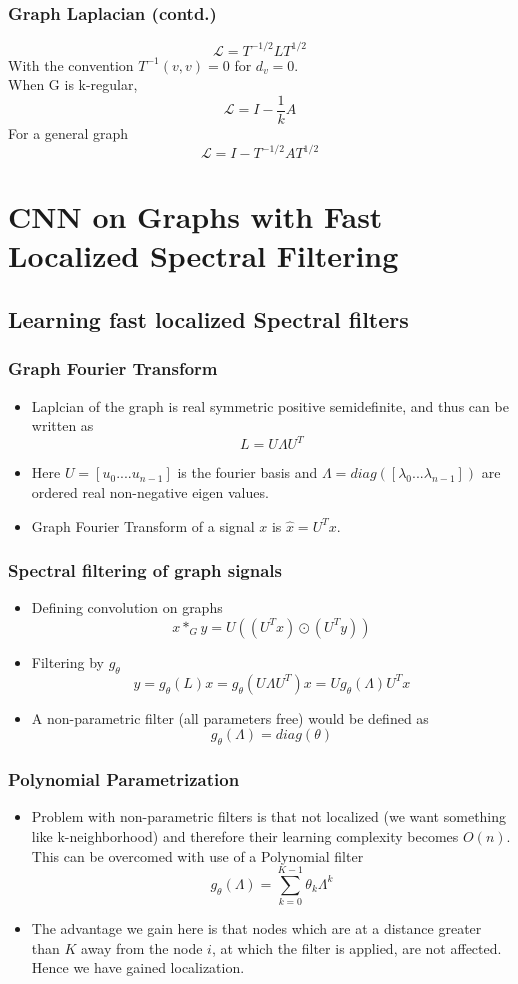 \documentclass{beamer}
\begin{document}
\begin{frame}
  \frametitle{Graph Laplacian (contd.)}
  $$\mathcal{L} = T^{-1/2}LT^{1/2}$$
  With the convention $T^{-1}(v,v) = 0$ for $d_v = 0$.\\
  When G is k-regular,
  $$\mathcal{L} = I - \frac{1}{k}A$$
  For a general graph
  $$\mathcal{L} = I - T^{-1/2}AT^{1/2}$$
\end{frame}

\section{CNN on Graphs with Fast Localized Spectral Filtering}
\subsection{Learning fast localized Spectral filters}
\begin{frame}
  \frametitle{Graph Fourier Transform}
  \begin{itemize}
  \item Laplcian of the graph is real symmetric positive semidefinite, and thus can be written as
    $$L = U \Lambda U^{T}$$
  \item Here $U = [u_0 .... u_{n-1}]$ is the fourier basis and $\Lambda = diag([\lambda_0...\lambda_{n-1}])$ are ordered real non-negative eigen values.
  \item Graph Fourier Transform of a signal $x$ is $\hat{x} = U^{T}x$.
  \end{itemize}
\end{frame}

\begin{frame}
  \frametitle{Spectral filtering of graph signals}
  \begin{itemize}
  \item Defining convolution on graphs
    $$ x *_{G} y = U((U^T x) \odot (U^T y))$$
  \item Filtering by $g_{\theta}$
    $$ y = g_{\theta}(L)x = g_{\theta}(U \Lambda U^{T})x = Ug_{\theta}(\Lambda) U^T x $$
  \item A non-parametric filter (all parameters free) would be defined as
    $$g_{\theta}(\Lambda) = diag(\theta)$$
  \end{itemize}
\end{frame}

\begin{frame}
  \frametitle{Polynomial Parametrization}
  \begin{itemize}
  \item   Problem with non-parametric filters is that not localized (we want something like k-neighborhood) and therefore their learning complexity becomes $O(n)$. This can be overcomed with use of a Polynomial filter
    $$g_{\theta}(\Lambda) = \sum_{k = 0}^{K-1}\theta_k\Lambda^k$$
  \item The advantage we gain here is that nodes which are at a distance greater than $K$ away from the node $i$, at which the filter is applied, are not affected. Hence we have gained localization.
  \end{itemize}
\end{frame}
\end{document}
